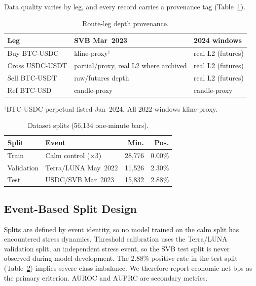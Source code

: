 \documentclass[sigconf,anonymous,natbib=false]{acmart}
\begin{document}
Data quality varies by leg, and every record carries a provenance tag
(Table~\ref{tab:route_provenance}).

\begin{table}[t]
\centering
\caption{Route-leg depth provenance.}
\label{tab:route_provenance}
\setlength{\tabcolsep}{2pt}
{\scriptsize
\begin{tabular}{lp{2.1cm}p{2.1cm}}
\toprule
\textbf{Leg} & \textbf{SVB Mar~2023} & \textbf{2024 windows}\\
\midrule
Buy BTC-USDC    & kline-proxy$^\dagger$  & real L2 (futures)\\
Cross USDC-USDT & partial/proxy, real L2 where archived  & real L2 (futures)\\
Sell BTC-USDT   & raw/futures depth     & real L2 (futures)\\
Ref BTC-USD     & candle-proxy          & candle-proxy\\
\bottomrule
\end{tabular}
}
{\footnotesize $^\dagger$BTC-USDC perpetual listed Jan~2024.
All 2022 windows kline-proxy.}
\end{table}

\begin{table}[t]
\centering
\caption{Dataset splits (56,134 one-minute bars).}
\label{tab:dataset}
\setlength{\tabcolsep}{4pt}
{\small
\begin{tabular}{llrr}
\toprule
\textbf{Split} & \textbf{Event} & \textbf{Min.} & \textbf{Pos.}\\
\midrule
Train      & Calm control ($\times$3) & 28,776 & 0.00\%\\
Validation & Terra/LUNA May~2022      & 11,526 & 2.30\%\\
Test       & USDC/SVB Mar~2023        & 15,832 & 2.88\%\\
\bottomrule
\end{tabular}
}
\end{table}

\subsection{Event-Based Split Design}
\label{sec:splits}

Splits are defined by event identity, so no model trained on the calm
split has encountered stress dynamics.
Threshold calibration uses the Terra/LUNA validation split, an
independent stress event, so the SVB test split is never observed
during model development.
The 2.88\% positive rate in the test split (Table~\ref{tab:dataset}) implies severe class imbalance.
We therefore report economic net bps as the primary criterion. AUROC
and AUPRC are secondary metrics.
\end{document}
